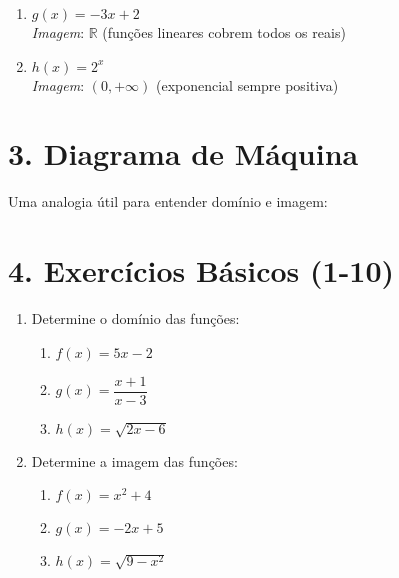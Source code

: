\documentclass[11pt]{article}
\begin{document}
\begin{multicols}{2}
\begin{enumerate}
    \item $g(x) = -3x + 2$ \\
    \textit{Imagem}: $\mathbb{R}$ (funções lineares cobrem todos os reais)
    
    \item $h(x) = 2^x$ \\
    \textit{Imagem}: $(0, +\infty)$ (exponencial sempre positiva)
\end{enumerate}

\section*{3. Diagrama de Máquina}
Uma analogia útil para entender domínio e imagem:

\begin{center}
\end{center}

\section*{4. Exercícios Básicos (1-10)}
\begin{enumerate}
    \item Determine o domínio das funções:
    \begin{enumerate}[label=\alph*)]
        \item $f(x) = 5x - 2$
        \item $g(x) = \dfrac{x+1}{x-3}$
        \item $h(x) = \sqrt{2x - 6}$
    \end{enumerate}
    
    \item Determine a imagem das funções:
    \begin{enumerate}[label=\alph*)]
        \item $f(x) = x^2 + 4$
        \item $g(x) = -2x + 5$
        \item $h(x) = \sqrt{9 - x^2}$
    \end{enumerate}
    

\end{enumerate}
\end{multicols}
\end{document}
